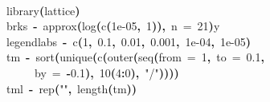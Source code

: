 \documentclass[a4paper]{article}
\newcommand{\hlnumber}[1]{\textcolor[rgb]{0.0823529411764706,0.0784313725490196,0.709803921568627}{#1}}%
\newcommand{\hlfunctioncall}[1]{\textcolor[rgb]{1,0,0}{#1}}%
\newcommand{\hlstring}[1]{\textcolor[rgb]{0.6,0.6,1}{#1}}%
\newcommand{\hlkeyword}[1]{\textcolor[rgb]{0,0,0}{\textbf{#1}}}%
\newcommand{\hlargument}[1]{\textcolor[rgb]{0.694117647058824,0.247058823529412,0.0196078431372549}{#1}}%
\newcommand{\hlassignement}[1]{\textcolor[rgb]{0.215686274509804,0.215686274509804,0.384313725490196}{\textbf{#1}}}%
\newcommand{\hlsymbol}[1]{\textcolor[rgb]{0,0,0}{#1}}%
\newcommand{\hlprompt}[1]{\textcolor[rgb]{0,0,0}{#1}}%
\newcommand{\hlstd}[1]{\textcolor[rgb]{0,0,0}{#1}}%
\newenvironment{Houtput}{\raggedright}{%
%
}
\begin{document}
\begin{Houtput}
\hspace*{\fill}\\
\hlstd{}\ttfamily\noindent
\hlprompt{\usebox{\hlnormalsizeboxgreaterthan}{\ }}\hlfunctioncall{library}\hlkeyword{(}\hlsymbol{lattice}\hlkeyword{)}\mbox{}
\normalfont
\hspace*{\fill}\\
\hlstd{}\ttfamily\noindent
\hlprompt{\usebox{\hlnormalsizeboxgreaterthan}{\ }}\hlsymbol{brks}{\ }\hlassignement{\usebox{\hlnormalsizeboxlessthan}-}{\ }\hlfunctioncall{approx}\hlkeyword{(}\hlfunctioncall{log}\hlkeyword{(}\hlfunctioncall{c}\hlkeyword{(}\hlnumber{1e-05}\hlkeyword{,}{\ }\hlnumber{1}\hlkeyword{)}\hlkeyword{)}\hlkeyword{,}{\ }\hlargument{n}{\ }\hlargument{=}{\ }\hlnumber{21}\hlkeyword{)}\hlkeyword{\usebox{\hlnormalsizeboxdollar}}\hlsymbol{y}\mbox{}
\normalfont
\hspace*{\fill}\\
\hlstd{}\ttfamily\noindent
\hlprompt{\usebox{\hlnormalsizeboxgreaterthan}{\ }}\hlsymbol{legendlabs}{\ }\hlassignement{\usebox{\hlnormalsizeboxlessthan}-}{\ }\hlfunctioncall{c}\hlkeyword{(}\hlnumber{1}\hlkeyword{,}{\ }\hlnumber{0.1}\hlkeyword{,}{\ }\hlnumber{0.01}\hlkeyword{,}{\ }\hlnumber{0.001}\hlkeyword{,}{\ }\hlnumber{1e-04}\hlkeyword{,}{\ }\hlnumber{1e-05}\hlkeyword{)}\mbox{}
\normalfont
\hspace*{\fill}\\
\hlstd{}\ttfamily\noindent
\hlprompt{\usebox{\hlnormalsizeboxgreaterthan}{\ }}\hlsymbol{tm}{\ }\hlassignement{\usebox{\hlnormalsizeboxlessthan}-}{\ }\hlfunctioncall{sort}\hlkeyword{(}\hlfunctioncall{unique}\hlkeyword{(}\hlfunctioncall{c}\hlkeyword{(}\hlfunctioncall{outer}\hlkeyword{(}\hlfunctioncall{seq}\hlkeyword{(}\hlargument{from}{\ }\hlargument{=}{\ }\hlnumber{1}\hlkeyword{,}{\ }\hlargument{to}{\ }\hlargument{=}{\ }\hlnumber{0.1}\hlkeyword{,}\hspace*{\fill}\\
\hlstd{}\hlprompt{{\ }}{\ }{\ }{\ }{\ }\hlargument{by}{\ }\hlargument{=}{\ }\hlkeyword{-}\hlnumber{0.1}\hlkeyword{)}\hlkeyword{,}{\ }\hlnumber{10}\hlkeyword{\usebox{\hlnormalsizeboxhat}}\hlkeyword{(}\hlnumber{4}\hlkeyword{:}\hlnumber{0}\hlkeyword{)}\hlkeyword{,}{\ }\hlstring{"/"}\hlkeyword{)}\hlkeyword{)}\hlkeyword{)}\hlkeyword{)}\mbox{}
\normalfont
\hspace*{\fill}\\
\hlstd{}\ttfamily\noindent
\hlprompt{\usebox{\hlnormalsizeboxgreaterthan}{\ }}\hlsymbol{tml}{\ }\hlassignement{\usebox{\hlnormalsizeboxlessthan}-}{\ }\hlfunctioncall{rep}\hlkeyword{(}\hlstring{""}\hlkeyword{,}{\ }\hlfunctioncall{length}\hlkeyword{(}\hlsymbol{tm}\hlkeyword{)}\hlkeyword{)}\mbox{}

\end{Houtput}
\end{document}
